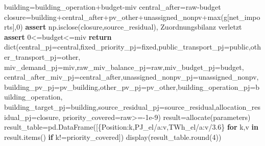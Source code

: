 \documentclass[
  ngerman,
  a4paper,
  DIV=11]{scrreprt}
\newenvironment{Shaded}{\begin{snugshade}}{\end{snugshade}}
\newcommand{\BuiltInTok}[1]{\textcolor[rgb]{0.00,0.23,0.31}{#1}}
\newcommand{\ControlFlowTok}[1]{\textcolor[rgb]{0.00,0.23,0.31}{\textbf{#1}}}
\newcommand{\DecValTok}[1]{\textcolor[rgb]{0.68,0.00,0.00}{#1}}
\newcommand{\FloatTok}[1]{\textcolor[rgb]{0.68,0.00,0.00}{#1}}
\newcommand{\KeywordTok}[1]{\textcolor[rgb]{0.00,0.23,0.31}{\textbf{#1}}}
\newcommand{\NormalTok}[1]{\textcolor[rgb]{0.00,0.23,0.31}{#1}}
\newcommand{\OperatorTok}[1]{\textcolor[rgb]{0.37,0.37,0.37}{#1}}
\newcommand{\StringTok}[1]{\textcolor[rgb]{0.13,0.47,0.30}{#1}}
\begin{document}
\begin{Shaded}
\begin{Highlighting}[]
\NormalTok{    building}\OperatorTok{=}\NormalTok{building\_operation}\OperatorTok{+}\NormalTok{budget}\OperatorTok{{-}}\NormalTok{miv}
\NormalTok{    central\_after}\OperatorTok{=}\NormalTok{raw}\OperatorTok{{-}}\NormalTok{budget}
\NormalTok{    closure}\OperatorTok{=}\NormalTok{building}\OperatorTok{+}\NormalTok{central\_after}\OperatorTok{+}\NormalTok{pv\_other}\OperatorTok{+}\NormalTok{unassigned\_nonpv}\OperatorTok{+}\BuiltInTok{max}\NormalTok{(g[}\StringTok{\textquotesingle{}net\_imports\textquotesingle{}}\NormalTok{],}\DecValTok{0}\NormalTok{)}
    \ControlFlowTok{assert}\NormalTok{ np.isclose(closure,source\_residual), }\StringTok{\textquotesingle{}Zuordnungsbilanz verletzt\textquotesingle{}}
    \ControlFlowTok{assert} \DecValTok{0}\OperatorTok{\textless{}=}\NormalTok{budget}\OperatorTok{\textless{}=}\NormalTok{miv}
    \ControlFlowTok{return} \BuiltInTok{dict}\NormalTok{(central\_pj}\OperatorTok{=}\NormalTok{central,fixed\_priority\_pj}\OperatorTok{=}\NormalTok{fixed,public\_transport\_pj}\OperatorTok{=}\NormalTok{public,other\_transport\_pj}\OperatorTok{=}\NormalTok{other,}
\NormalTok{                miv\_demand\_pj}\OperatorTok{=}\NormalTok{miv,raw\_miv\_balance\_pj}\OperatorTok{=}\NormalTok{raw,miv\_budget\_pj}\OperatorTok{=}\NormalTok{budget,}
\NormalTok{                central\_after\_miv\_pj}\OperatorTok{=}\NormalTok{central\_after,unassigned\_nonpv\_pj}\OperatorTok{=}\NormalTok{unassigned\_nonpv,}
\NormalTok{                building\_pv\_pj}\OperatorTok{=}\NormalTok{pv\_building,other\_pv\_pj}\OperatorTok{=}\NormalTok{pv\_other,building\_operation\_pj}\OperatorTok{=}\NormalTok{building\_operation,}
\NormalTok{                building\_target\_pj}\OperatorTok{=}\NormalTok{building,source\_residual\_pj}\OperatorTok{=}\NormalTok{source\_residual,allocation\_residual\_pj}\OperatorTok{=}\NormalTok{closure,}
\NormalTok{                priority\_covered}\OperatorTok{=}\NormalTok{raw}\OperatorTok{\textgreater{}={-}}\FloatTok{1e{-}9}\NormalTok{)}
\NormalTok{result}\OperatorTok{=}\NormalTok{allocate(parameters)}
\NormalTok{result\_table}\OperatorTok{=}\NormalTok{pd.DataFrame([\{}\StringTok{\textquotesingle{}Position\textquotesingle{}}\NormalTok{:k,}\StringTok{\textquotesingle{}PJ\_el/a\textquotesingle{}}\NormalTok{:v,}\StringTok{\textquotesingle{}TWh\_el/a\textquotesingle{}}\NormalTok{:v}\OperatorTok{/}\FloatTok{3.6}\NormalTok{\} }\ControlFlowTok{for}\NormalTok{ k,v }\KeywordTok{in}\NormalTok{ result.items() }\ControlFlowTok{if}\NormalTok{ k}\OperatorTok{!=}\StringTok{\textquotesingle{}priority\_covered\textquotesingle{}}\NormalTok{])}
\NormalTok{display(result\_table.}\BuiltInTok{round}\NormalTok{(}\DecValTok{4}\NormalTok{))}
\end{Highlighting}
\end{Shaded}
\end{document}
